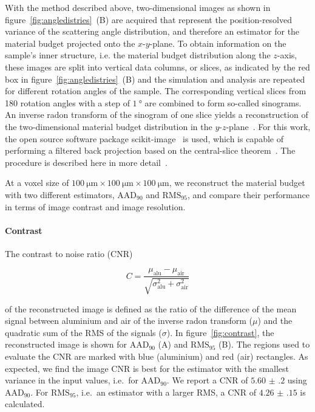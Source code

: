 \documentclass{PoS}
\newcommand{\rmsninetyfive}{\ensuremath{\textrm{RMS}_\textrm{95}}}
\newcommand{\aadninety}{\ensuremath{\textrm{AAD}_\textrm{90}}}
\begin{document}
With the method described above, two-dimensional images as shown in  figure~\ref{fig:angledistries}~(B) are acquired that represent the position-resolved variance of the scattering angle distribution,
 and therefore an estimator for the material budget projected onto the $x$-$y$-plane. 
To obtain information on the sample's inner structure, i.e. the material budget distribution along the $z$-axis, these images are split into vertical data columns, or slices,
as indicated by the red box in figure~\ref{fig:angledistries}~(B) and
 the simulation and analysis are repeated for different rotation angles of the sample.
The corresponding vertical slices from 180 rotation angles with a step of $\SI{1}{\degree}$ are combined to form so-called sinograms.
An inverse radon transform of the sinogram of one slice yields a reconstruction of the two-dimensional material budget distribution in the $y$-$z$-plane~\cite{ref:deans2007radon}.
For this work, the open source software package scikit-image~\cite{ref:scikitWebpage,ref:scikitArticle} is used,
 which is capable of performing a filtered back projection based on the central-slice theorem~\cite{ref:deans2007radon}.
The procedure is described here in more detail~\cite{JansenAPLarxiv}. 

At a voxel size of $\SI{100}{\um} \times \SI{100}{\um} \times \SI{100}{\um}$, we reconstruct the material budget with two different estimators, $\aadninety$ and $\rmsninetyfive$,
 and compare their performance in terms of image contrast and image resolution. 


\paragraph{Contrast}

The contrast to noise ratio (CNR) 

\begin{equation}
 C = \frac{\mu_{\textrm{alu}} - \mu_{\textrm{air}}}{\sqrt{\sigma_{\textrm{alu}}^{2} + \sigma_{\textrm{air}}^{2}}}
\end{equation}

\noindent
of the reconstructed image is defined as the ratio of the difference of the mean signal between aluminium and air of the inverse radon transform ($\mu$)
 and the quadratic sum of the RMS of the signals ($\sigma$). 
In figure~\ref{fig:contrast}, the reconstructed image is shown for $\aadninety$ (A) and $\rmsninetyfive$ (B).
The regions used to evaluate the CNR are marked with blue (aluminium) and red (air) rectangles.
As expected, we find the image CNR is best for the estimator with the smallest variance in the input values, i.e.\ for $\aadninety$. 
We report a CNR of $\num{5.60(20)}$ using $\aadninety$. 
For $\rmsninetyfive$, i.e.\ an estimator with a larger RMS, a CNR of $\num{4.26(15)}$ is calculated. 
\end{document}
